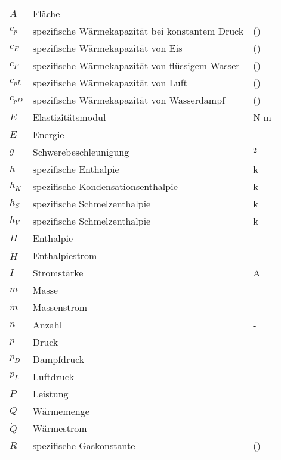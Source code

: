 \begin{onehalfspacing}
\begin{longtable}[h]{p{} p{} p{}}
		$A$ & Fläche & \squaremetre\\
		$c_{p}$&spezifische Wärmekapazität bei konstantem Druck&\joule\per(\kilogram\usk\kelvin)\\
		$c_{E}$&spezifische Wärmekapazität von Eis&\joule\per(\kilogram\usk\kelvin)\\		
		$c_{F}$&spezifische Wärmekapazität von flüssigem Wasser&\joule\per(\kilogram\usk\kelvin)\\
		$c_{pL}$&spezifische Wärmekapazität von Luft&\joule\per(\kilogram\usk\kelvin)\\	
		$c_{pD}$&spezifische Wärmekapazität von Wasserdampf &\joule\per(\kilogram\usk\kelvin)\\		
		$E$ & Elastizitätsmodul & N \per m\squaremetre \\
		$E$ & Energie & \joule\\
		$g$ & Schwerebeschleunigung & \meter \per \second$^2$\\
		$h $ & spezifische Enthalpie & k\joule \per \kilogram\\		
		$h_{K} $ & spezifische Kondensationsenthalpie & k\joule \per \kilogram\\	
		$h_{S} $ & spezifische Schmelzenthalpie & k\joule \per \kilogram\\	
		$h_{V} $ & spezifische Schmelzenthalpie & k\joule \per \kilogram\\
		$H $ & Enthalpie & \joule\\		
		$\dot{H}$ & Enthalpiestrom & \joule\per\second\\
		$I$ 	& Stromstärke & A \\
		$m$ & Masse & \kilogram \\
		$\dot{m}$ & Massenstrom & \kilogram\per\second\\
		$n$ & Anzahl & -\\
		$p$ & Druck & \pascal\\
		$p_{D}$ & Dampfdruck & \pascal\\
		$p_{L}$ & Luftdruck & \pascal\\		
		$P$ & Leistung & \watt \\
		$Q$		& Wärmemenge & \joule\\
		$\dot{Q}$ & Wärmestrom & \watt\\
		$R$ & spezifische Gaskonstante & \joule\per(\kilogram\usk\kelvin)\\

\end{longtable}
\end{onehalfspacing}
